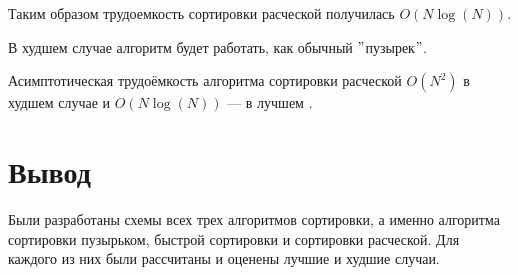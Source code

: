 Таким образом трудоемкость сортировки расческой получилась $O(N\log(N))$.

В худшем случае алгоритм будет работать, как обычный $"$пузырек$"$.

Асимптотическая трудоёмкость алгоритма сортировки расческой $O(N^{2})$ в худшем случае и $O(N\log(N))$ --- в лучшем \cite{combsort}.

\section*{Вывод}

Были разработаны схемы всех трех алгоритмов сортировки, а именно алгоритма сортировки пузырьком, быстрой сортировки и сортировки расческой. Для каждого из них были рассчитаны и оценены лучшие и худшие случаи.


